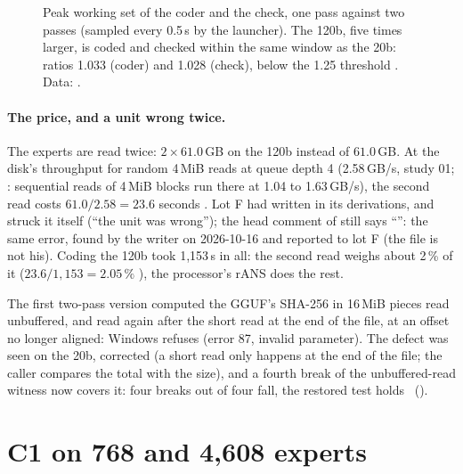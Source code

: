 \begin{figure}[ht]
\centering
\TdFmtGraphePointes
\caption[Peak memory of the coder and the check]{Peak working set of the coder and the check, one pass against two passes (sampled every 0.5\,s by the launcher). The 120b, five times larger, is coded and checked within the same window as the 20b: ratios 1.033 (coder) and 1.028 (check), below the 1.25 threshold \mes. Data: .}
\label{t2fmt:fig:pointes}
\end{figure}

\paragraph{The price, and a unit wrong twice.} The experts are read twice: $2 \times 61.0$\,GB on the 120b instead of $61.0$\,GB. At the disk's throughput for random 4\,MiB reads at queue depth 4 (2.58\,GB/s, study 01; : sequential reads of 4\,MiB blocks run there at 1.04 to 1.63\,GB/s), the second read costs $61.0 / 2.58 = 23.6$ seconds \calc. Lot F had written  in its derivations, and struck it itself (``the unit was wrong''); the head comment of  still says ``'': the same error, found by the writer on 2026-10-16 and reported to lot F (the file is not his). Coding the 120b took 1{,}153\,s in all: the second read weighs about 2\,\% of it ($23.6 / 1{,}153 = 2.05\,\%$ \calc), the processor's rANS does the rest.

\begin{faux}[title={What the witness had not covered: error 87}]
The first two-pass version computed the GGUF's SHA-256 in 16\,MiB pieces read unbuffered, and read again after the short read at the end of the file, at an offset no longer aligned: Windows refuses (error 87, invalid parameter). The defect was seen on the 20b, corrected (a short read only happens at the end of the file; the caller compares the total with the size), and a fourth break of the unbuffered-read witness now covers it: four breaks out of four fall, the restored test holds \mes~().
\end{faux}

\section{C1 on 768 and 4{,}608 experts}\label{t2fmt:sec:cun}

